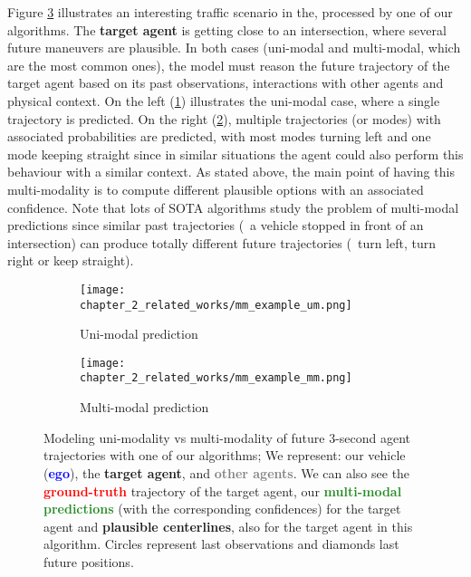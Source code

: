 Figure \ref{fig:chapter_2_related_works/um_vs_mm_mp} illustrates an interesting traffic scenario in the, processed by one of our algorithms. The \textbf{\textcolor{YellowOrange}{target agent}} is getting close to an intersection, where several future maneuvers are plausible. In both cases (uni-modal and multi-modal, which are the most common ones), the model must reason the future trajectory of the target agent based on its past observations, interactions with other agents and physical context. On the left (\ref{subfig:chapter_2_related_works/um_vs_mm_mp_a}) illustrates the uni-modal case, where a single trajectory is predicted. On the right (\ref{subfig:chapter_2_related_works/um_vs_mm_mp_b}), multiple trajectories (or modes) with associated probabilities are predicted, with most modes turning left and one mode keeping straight since in similar situations the agent could also perform this behaviour with a similar context. As stated above, the main point of having this multi-modality is to compute different plausible options with an associated confidence. Note that lots of \ac{SOTA} algorithms study the problem of multi-modal predictions since similar past trajectories (\eg \ a vehicle stopped in front of an intersection) can produce totally different future trajectories (\eg \ turn left, turn right or keep straight).

\begin{figure}[t!]
	\begin{subfigure}{0.5\textwidth}
		\texttt{[image: chapter\_2\_related\_works/mm\_example\_um.png]}
		\caption{Uni-modal prediction}
		\label{subfig:chapter_2_related_works/um_vs_mm_mp_a}
	\end{subfigure}
	\hfill
	\begin{subfigure}{0.5\textwidth}
		\texttt{[image: chapter\_2\_related\_works/mm\_example\_mm.png]}
		\caption{Multi-modal prediction}
		\label{subfig:chapter_2_related_works/um_vs_mm_mp_b}
	\end{subfigure}
	\captionsetup{justification=justified}
	\caption[Modeling uni-modality vs multi-modality of future $3$-second agent trajectories with one of our algorithms]{Modeling uni-modality vs multi-modality of future $3$-second agent trajectories with one of our algorithms; We represent: our vehicle (\textbf{\textcolor{blue}{ego}}), the \textbf{\textcolor{YellowOrange}{target agent}}, and \textbf{\textcolor{gray}{other agents}}. We can also see the \textbf{\textcolor{red}{ground-truth}} trajectory of the target agent, our \textbf{\textcolor{ForestGreen}{multi-modal predictions}} (with the corresponding confidences) for the target agent and \textbf{plausible centerlines}, also for the target agent in this algorithm. Circles represent last observations and diamonds last future positions.}
	\label{fig:chapter_2_related_works/um_vs_mm_mp}
\end{figure}


